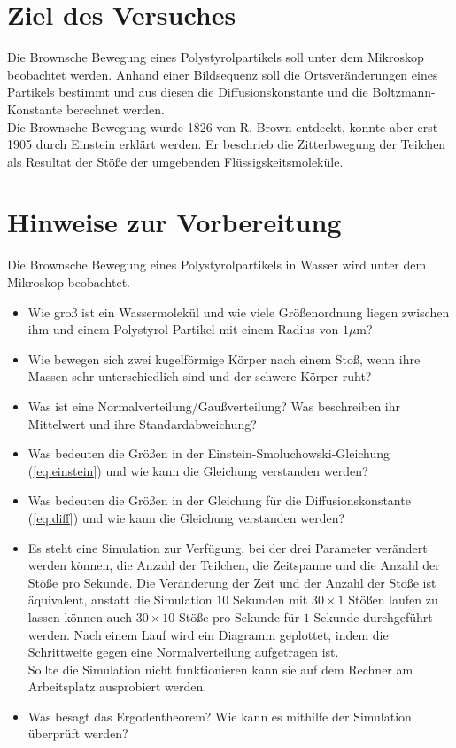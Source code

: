 \section*{Ziel des Versuches}

Die Brownsche Bewegung eines Polystyrolpartikels soll unter dem Mikroskop beobachtet werden. Anhand einer Bildsequenz soll die Ortsveränderungen eines Partikels bestimmt und aus diesen die Diffusionskonstante und die Boltzmann-Konstante berechnet werden.\\
Die Brownsche Bewegung wurde 1826 von R. Brown entdeckt, konnte aber erst 1905 durch Einstein erklärt werden. Er beschrieb die Zitterbwegung der Teilchen als Resultat der Stöße der umgebenden Flüssigskeitsmoleküle.

\section*{Hinweise zur Vorbereitung}
Die Brownsche Bewegung eines Polystyrolpartikels in Wasser wird unter dem Mikroskop beobachtet.
\begin{itemize}
  \item Wie groß ist ein Wassermolekül und wie viele Größenordnung liegen zwischen ihm und einem Polystyrol-Partikel mit einem Radius von $1 \mu$m?
  \item Wie bewegen sich zwei kugelförmige Körper nach einem Stoß, wenn ihre Massen sehr unterschiedlich sind und der schwere Körper ruht?
  \item Was ist eine Normalverteilung/Gaußverteilung? Was beschreiben ihr Mittelwert und ihre Standardabweichung?
  \item Was bedeuten die Größen in der Einstein-Smoluchowski-Gleichung (\ref{eq:einstein}) und wie kann die Gleichung verstanden werden?
  \item Was bedeuten die Größen in der Gleichung für die Diffusionskonstante (\ref{eq:diff}) und wie kann die Gleichung verstanden werden?
  \item Es steht eine Simulation zur Verfügung, bei der drei Parameter verändert werden können, die Anzahl der Teilchen, die Zeitspanne und die Anzahl der Stöße pro Sekunde. Die Veränderung der Zeit und der Anzahl der Stöße ist äquivalent, anstatt die Simulation $10$ Sekunden mit $30\times1$ Stößen laufen zu lassen können auch $30\times10$ Stöße pro Sekunde für $1$ Sekunde durchgeführt werden. Nach einem Lauf wird ein Diagramm geplottet, indem die Schrittweite gegen eine Normalverteilung aufgetragen ist.\\
  Sollte die Simulation nicht funktionieren kann sie auf dem Rechner am Arbeitsplatz ausprobiert werden.
  \item Was besagt das Ergodentheorem? Wie kann es mithilfe der Simulation überprüft werden?
\end{itemize}

